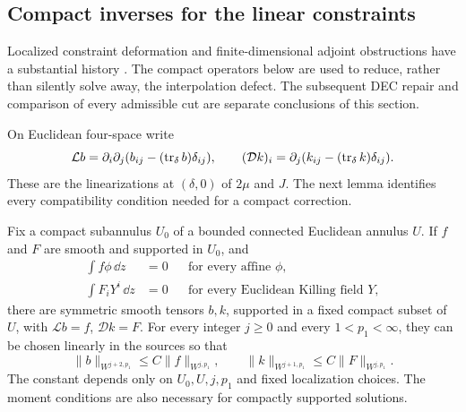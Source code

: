 \subsection*{Compact inverses for the linear constraints}

Localized constraint deformation and finite-dimensional adjoint
obstructions have a substantial history
\cite{CorvinoSchoen2006,ChruscielDelay2003}. The compact operators
below are used to reduce, rather than silently solve away, the
interpolation defect. The subsequent DEC repair and comparison of
every admissible cut are separate conclusions of this section.

On Euclidean four-space write
\begin{equation}\label{n4:end:linear-operators}
 \mathcal L b=\partial_i\partial_j
                  (b_{ij}-(\operatorname{tr}_\delta b)\delta_{ij}),\qquad
 (\mathcal D k)_i=\partial_j
                  (k_{ij}-(\operatorname{tr}_\delta k)\delta_{ij}).
\end{equation}
These are the linearizations at \((\delta,0)\) of \(2\mu\) and \(J\).
The next lemma identifies every compatibility condition needed for a
compact correction.

\begin{lemma}\label{n4:end:compact-inverses}
Fix a compact subannulus \(U_0\) of a bounded connected Euclidean annulus
\(U\). If \(f\) and \(F\) are smooth and supported in \(U_0\), and
\begin{equation}\label{n4:end:compatibility}
 \begin{aligned}
 \int f\phi\,\dd z&=0 &&\text{for every affine }\phi,\\
 \int F_iY^i\,\dd z&=0 &&\text{for every Euclidean Killing field }Y,
 \end{aligned}
\end{equation}
there are symmetric smooth tensors \(b,k\), supported in a fixed compact
subset of \(U\), with \(\mathcal Lb=f\), \(\mathcal Dk=F\).
For every integer \(j\ge0\) and every \(1<p_1<\infty\), they can be
chosen linearly in the sources so that
\begin{equation}\label{n4:end:inverse-bounds}
 \|b\|_{W^{j+2,p_1}}\le C\|f\|_{W^{j,p_1}},\qquad
 \|k\|_{W^{j+1,p_1}}\le C\|F\|_{W^{j,p_1}}.
\end{equation}
The constant depends only on \(U_0,U,j,p_1\) and fixed localization
choices. The moment conditions are also necessary for compactly
supported solutions.
\end{lemma}

